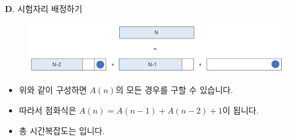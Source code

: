 \begin{frame}{\textbf{D}. 시험자리 배정하기}
	\begin{figure}[h!]
		\centering
		\includegraphics[width=0.9\linewidth]{../images/set-examseats/2.png}
	\end{figure}
	\begin{itemize}

		\item 위와 같이 구성하면 $A(n)$의 모든 경우를 구할 수 있습니다.
		\item 따라서 점화식은 $A(n) = A(n-1) + A(n-2) + 1$이 됩니다.
		\item 총 시간복잡도는 입니다.
		
	\end{itemize}
	
\end{frame}